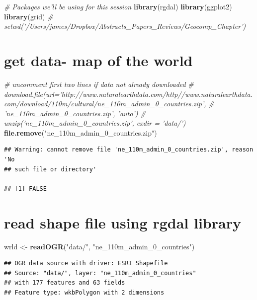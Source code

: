 \documentclass[]{article}
\newenvironment{Shaded}{}{}
\newcommand{\KeywordTok}[1]{\textcolor[rgb]{0.00,0.44,0.13}{\textbf{{#1}}}}
\newcommand{\StringTok}[1]{\textcolor[rgb]{0.25,0.44,0.63}{{#1}}}
\newcommand{\CommentTok}[1]{\textcolor[rgb]{0.38,0.63,0.69}{\textit{{#1}}}}
\newcommand{\NormalTok}[1]{{#1}}
\begin{document}
\begin{Shaded}
\begin{Highlighting}[]
\CommentTok{# Packages we'll be using for this session}
\KeywordTok{library}\NormalTok{(rgdal)}
\KeywordTok{library}\NormalTok{(ggplot2)}
\KeywordTok{library}\NormalTok{(grid)}
\CommentTok{# setwd('/Users/james/Dropbox/Abstracts_Papers_Reviews/Geocomp_Chapter')}
\end{Highlighting}
\end{Shaded}

\section{get data- map of the world}

\begin{Shaded}
\begin{Highlighting}[]
\CommentTok{# uncomment first two lines if data not already downloaded}
\CommentTok{# download.file(url='http://www.naturalearthdata.com/http//www.naturalearthdata.com/download/110m/cultural/ne_110m_admin_0_countries.zip',}
\CommentTok{# 'ne_110m_admin_0_countries.zip', 'auto')}
\CommentTok{# unzip('ne_110m_admin_0_countries.zip', exdir = 'data/')}
\KeywordTok{file.remove}\NormalTok{(}\StringTok{"ne_110m_admin_0_countries.zip"}\NormalTok{)}
\end{Highlighting}
\end{Shaded}

\begin{verbatim}
## Warning: cannot remove file 'ne_110m_admin_0_countries.zip', reason 'No
## such file or directory'

## [1] FALSE
\end{verbatim}

\section{read shape file using rgdal library}

\begin{Shaded}
\begin{Highlighting}[]
\NormalTok{wrld <-}\StringTok{ }\KeywordTok{readOGR}\NormalTok{(}\StringTok{"data/"}\NormalTok{, }\StringTok{"ne_110m_admin_0_countries"}\NormalTok{)}
\end{Highlighting}
\end{Shaded}

\begin{verbatim}
## OGR data source with driver: ESRI Shapefile 
## Source: "data/", layer: "ne_110m_admin_0_countries"
## with 177 features and 63 fields
## Feature type: wkbPolygon with 2 dimensions
\end{verbatim}
\end{document}

